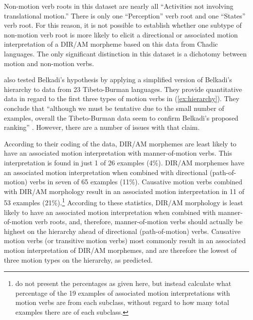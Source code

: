 Non-motion verb roots in this dataset are nearly all ``Activities not involving translational motion.'' There is only one ``Perception'' verb root and one ``States'' verb root. For this reason, it is not possible to establish whether one subtype of non-motion verb root is more likely to elicit a directional or associated motion interpretation of a DIR/AM morpheme based on this data from Chadic languages. The only significant distinction in this dataset is a dichotomy between motion and non-motion verbs. 

\citet[368]{genettiDirectionAssociatedMotion2020} also tested Belkadi's hypothesis by applying a simplified version of Belkadi's hierarchy to data from 23 Tibeto-Burman languages. They provide quantitative data in regard to the first three types of motion verbs in (\ref{ex:hierarchy}). They conclude that ``although we must be tentative due to the small number of examples, overall the Tibeto-Burman data seem to confirm Belkadi’s proposed ranking'' \citep[371]{genettiDirectionAssociatedMotion2020}. However, there are a number of issues with that claim.

According to their coding of the data, DIR/AM morphemes are least likely to have an associated motion interpretation with manner-of-motion verbs. This interpretation is found in just 1 of 26 examples (4\%). DIR/AM morphemes have an associated motion interpretation when combined with directional (path-of-motion) verbs in seven of 65 examples (11\%). Causative motion verbs combined with DIR/AM morphology result in an associated motion interpretation in 11 of 53 examples (21\%).\footnote{\citet[370]{genettiDirectionAssociatedMotion2020} do not present the percentages as given here, but instead calculate what percentage of the 19 examples of associated motion interpretations with motion verbs are from each subclass, without regard to how many total examples there are of each subclass.} According to these statistics, DIR/AM morphology is least likely to have an associated motion interpretation when combined with manner-of-motion verb roots, and, therefore, manner-of-motion verbs should actually be highest on the hierarchy ahead of directional (path-of-motion) verbs. Causative motion verbs (or transitive motion verbs) most commonly result in an associated motion interpretation of DIR/AM morphemes, and are therefore the lowest of three motion types on the hierarchy, as predicted.

